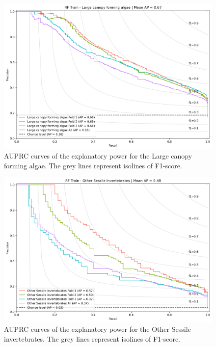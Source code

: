 \begin{figure}
\hypertarget{fig:chap3figS29}{%
\centering
\includegraphics{03-Chapitre3/figures/supplementary/03-precision_recall_curve_train_rf_Large canopy forming algae.png}
\caption{AUPRC curves of the explanatory power for the Large canopy
forming algae. The grey lines represent isolines of
F1-score.}\label{fig:chap3figS29}
}
\end{figure}

\begin{figure}
\hypertarget{fig:chap3figS30}{%
\centering
\includegraphics{03-Chapitre3/figures/supplementary/03-precision_recall_curve_train_rf_Other Sessile invertebrates.png}
\caption{AUPRC curves of the explanatory power for the Other Sessile
invertebrates. The grey lines represent isolines of
F1-score.}\label{fig:chap3figS30}
}
\end{figure}

